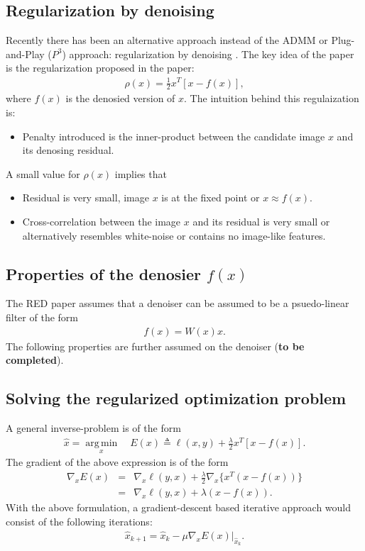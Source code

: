 \documentclass[a4paper, 11pt]{article}
\DeclareMathOperator*{\argmin}{arg\,min}
\begin{document}
\subsection{Regularization by denoising}
Recently there has been an alternative approach instead of the ADMM or Plug-and-Play ($P^3$) approach: regularization by denoising \cite{RED}. The key idea of the paper is the regularization proposed in the paper:
\begin{eqnarray*}
\rho(x)=\frac{1}{2}x^T[x-f(x)],  
\end{eqnarray*}
where $f(x)$ is the denosied version of $x$. The intuition behind this regulaization is:
\begin{itemize}
\item Penalty introduced is the inner-product between the candidate image $x$ and its denosing residual. 
\end{itemize}
A small value for $\rho(x)$ implies that 
\begin{itemize}
\item Residual is very small, image $x$ is at the fixed point or $x\approx f(x)$. 
\item Cross-correlation between the image $x$ and its residual is very small or alternatively resembles white-noise or contains no image-like features. 
\end{itemize}
\subsection{Properties of the denosier $f(x)$}
The RED paper assumes that a denoiser can be assumed to be a psuedo-linear filter of the form 
\begin{eqnarray*}
f(x)=W(x)x. 
\end{eqnarray*}
The following properties are further assumed on the denoiser (\textbf{to be completed}).
\subsection{Solving the regularized optimization problem}
A general inverse-problem is of the form 
\begin{eqnarray*}
\hat{x}=\underset{x}{\argmin} \quad E(x) \triangleq \ell(x,y)+\frac{\lambda}{2}x^T[x-f(x)]. 
\end{eqnarray*}
The gradient of the above expression is of the form 
\begin{eqnarray*}
\nabla_xE(x)&=&\nabla_x\ell(y,x)+\frac{\lambda}{2}\nabla_x\{x^T(x-f(x))\} \\
&=&\nabla_x\ell(y,x)+\lambda(x-f(x)). 
\end{eqnarray*}
With the above formulation, a gradient-descent based iterative approach would consist of the following iterations:
\begin{eqnarray*}
\hat{x}_{k+1}=\hat{x}_k-\mu \nabla_xE(x)|_{\hat{x}_k}. 
\end{eqnarray*}
\end{document}
